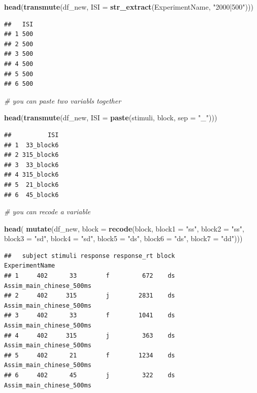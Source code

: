 \documentclass[]{book}
\newenvironment{Shaded}{\begin{snugshade}}{\end{snugshade}}
\newcommand{\KeywordTok}[1]{\textcolor[rgb]{0.13,0.29,0.53}{\textbf{#1}}}
\newcommand{\DataTypeTok}[1]{\textcolor[rgb]{0.13,0.29,0.53}{#1}}
\newcommand{\StringTok}[1]{\textcolor[rgb]{0.31,0.60,0.02}{#1}}
\newcommand{\CommentTok}[1]{\textcolor[rgb]{0.56,0.35,0.01}{\textit{#1}}}
\newcommand{\NormalTok}[1]{#1}
\begin{document}
\begin{Shaded}
\begin{Highlighting}[]
\KeywordTok{head}\NormalTok{(}\KeywordTok{transmute}\NormalTok{(df_new, }\DataTypeTok{ISI =} \KeywordTok{str_extract}\NormalTok{(ExperimentName, }\StringTok{"2000|500"}\NormalTok{)))}
\end{Highlighting}
\end{Shaded}

\begin{verbatim}
##   ISI
## 1 500
## 2 500
## 3 500
## 4 500
## 5 500
## 6 500
\end{verbatim}

\begin{Shaded}
\begin{Highlighting}[]
\CommentTok{# you can paste two variabls together}

\KeywordTok{head}\NormalTok{(}\KeywordTok{transmute}\NormalTok{(df_new, }\DataTypeTok{ISI =} \KeywordTok{paste}\NormalTok{(stimuli, block, }\DataTypeTok{sep =} \StringTok{"_"}\NormalTok{)))}
\end{Highlighting}
\end{Shaded}

\begin{verbatim}
##          ISI
## 1  33_block6
## 2 315_block6
## 3  33_block6
## 4 315_block6
## 5  21_block6
## 6  45_block6
\end{verbatim}

\begin{Shaded}
\begin{Highlighting}[]
\CommentTok{# you can recode a variable}

\KeywordTok{head}\NormalTok{( }\KeywordTok{mutate}\NormalTok{(df_new, }\DataTypeTok{block =} \KeywordTok{recode}\NormalTok{(block, }
                         \DataTypeTok{block1 =} \StringTok{"ss"}\NormalTok{, }\DataTypeTok{block2 =} \StringTok{"ss"}\NormalTok{,}
                         \DataTypeTok{block3 =} \StringTok{"sd"}\NormalTok{, }\DataTypeTok{block4 =} \StringTok{"sd"}\NormalTok{,}
                         \DataTypeTok{block5 =} \StringTok{"ds"}\NormalTok{, }\DataTypeTok{block6 =} \StringTok{"ds"}\NormalTok{,}
                         \DataTypeTok{block7 =} \StringTok{"dd"}\NormalTok{)))}
\end{Highlighting}
\end{Shaded}

\begin{verbatim}
##   subject stimuli response response_rt block           ExperimentName
## 1     402      33        f         672    ds Assim_main_chinese_500ms
## 2     402     315        j        2831    ds Assim_main_chinese_500ms
## 3     402      33        f        1041    ds Assim_main_chinese_500ms
## 4     402     315        j         363    ds Assim_main_chinese_500ms
## 5     402      21        f        1234    ds Assim_main_chinese_500ms
## 6     402      45        j         322    ds Assim_main_chinese_500ms
\end{verbatim}
\end{document}
